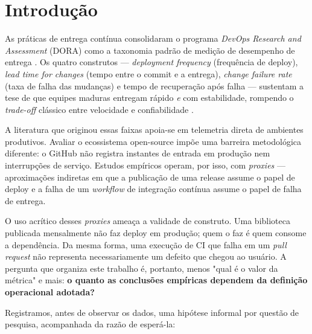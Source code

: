 
\section{Introdução}

As práticas de entrega contínua consolidaram o programa \emph{DevOps Research and
Assessment} (DORA) como a taxonomia padrão de medição de desempenho de entrega
\cite{forsgren2018}. Os quatro construtos --- \emph{deployment frequency}
(frequência de deploy), \emph{lead time for changes} (tempo entre o commit e a entrega),
\emph{change failure rate} (taxa de falha das mudanças) e tempo de recuperação após falha
--- sustentam a tese de que equipes maduras entregam rápido \emph{e} com
estabilidade, rompendo o \emph{trade-off} clássico entre velocidade e confiabilidade
\cite{dora2024}.

A literatura que originou essas faixas apoia-se em telemetria direta de ambientes
produtivos. Avaliar o ecossistema open-source impõe uma barreira metodológica diferente: o
GitHub não registra instantes de entrada em produção nem interrupções de serviço. Estudos
empíricos operam, por isso, com \emph{proxies} --- aproximações indiretas em que a
publicação de uma release assume o papel de deploy e a falha de um \emph{workflow} de
integração contínua assume o papel de falha de entrega.

O uso acrítico desses \emph{proxies} ameaça a validade de construto. Uma biblioteca
publicada mensalmente não faz deploy em produção; quem o faz é quem consome a dependência.
Da mesma forma, uma execução de CI que falha em um \emph{pull request} não representa
necessariamente um defeito que chegou ao usuário. A pergunta que organiza este trabalho é,
portanto, menos "qual é o valor da métrica" e mais: \textbf{o quanto as conclusões empíricas
dependem da definição operacional adotada?}

Registramos, antes de observar os dados, uma hipótese informal por questão de pesquisa,
acompanhada da razão de esperá-la:

